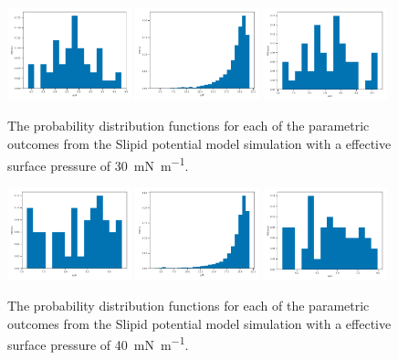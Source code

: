 \documentclass[amsmath,amssymb,superscriptaddress]{revtex4-1}
\begin{document}
\begin{figure}
 \centering
 \includegraphics[width=0.32\textwidth]{slipids_30_dh}
 \includegraphics[width=0.32\textwidth]{slipids_30_tt}
 \includegraphics[width=0.32\textwidth]{slipids_30_wph}
 \caption{The probability distribution functions for each of the parametric outcomes from the Slipid potential model simulation with a effective surface pressure of \SI{30}{\milli\newton\per\meter}.}
 \label{fig:sl30}
\end{figure}
%
%
\begin{figure}
 \centering
 \includegraphics[width=0.32\textwidth]{slipids_40_dh}
 \includegraphics[width=0.32\textwidth]{slipids_40_tt}
 \includegraphics[width=0.32\textwidth]{slipids_40_wph}
 \caption{The probability distribution functions for each of the parametric outcomes from the Slipid potential model simulation with a effective surface pressure of \SI{40}{\milli\newton\per\meter}.}
 \label{fig:sl40}
\end{figure}
\end{document}
